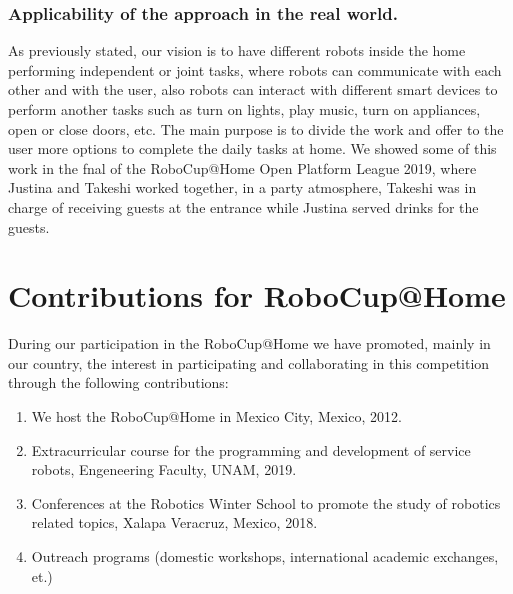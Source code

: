 \documentclass{llncs}
\begin{document}
\subsubsection{Applicability of the approach in the real world.} 

As previously stated, 
our vision is to have different robots inside the home performing independent or joint tasks, 
where robots can communicate with each other and with the user, 
 also robots can interact with different smart devices to perform another tasks such as turn on lights, play music, turn on appliances, open or close doors, etc.
The main purpose is to divide the work and offer to the user more options to complete the daily tasks at home.
We showed some of this work in the fnal of the RoboCup@Home Open Platform League 2019, where Justina and Takeshi worked together, in a party atmosphere, Takeshi was in charge of receiving guests at the entrance while Justina served drinks for the guests.



\section{Contributions for RoboCup@Home}\label{sec:contributions}
During our participation in the RoboCup@Home we have promoted, mainly in our country, 
the interest in participating and collaborating in this competition through the following contributions:

\begin{enumerate}
	\item We host the RoboCup@Home in Mexico City, Mexico, 2012.\\
	\item Extracurricular course for the programming and development of service robots, Engeneering Faculty, UNAM, 2019.\\
	\item Conferences at the Robotics Winter School to promote the study of robotics related topics, Xalapa Veracruz, Mexico, 2018.\\
	\item Outreach programs (domestic workshops, international academic exchanges, et.) 
\end{enumerate}



\end{document}
